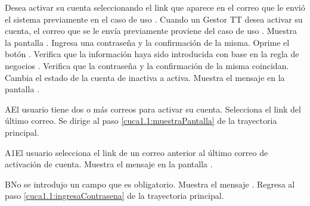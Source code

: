 \begin{UCtrayectoria}
	\UCpaso[\UCactor] Desea activar su cuenta seleccionando el link que aparece en el correo que le envió el sistema previamente en el caso de uso . Cuando un Gestor TT desea activar su cuenta, el correo que se le envía previamente proviene del caso de uso . 
	\UCpaso[\UCsist]  Muestra la pantalla . \label{cuca1.1:muestraPantalla}
	\UCpaso[\UCactor] Ingresa una contraseña y la confirmación de la misma.
	\UCpaso[\UCactor] Oprime el botón . 
	\UCpaso[\UCsist] Verifica que la información haya sido introducida con base en la regla de negocios .   \label{cuca1.1:ingresaContrasena}
	\UCpaso[\UCsist] Verifica que la contraseña y la confirmación de la misma coincidan. 
	\UCpaso[\UCsist] Cambia el estado de la cuenta de inactiva a activa. 
	\UCpaso[\UCsist] Muestra el mensaje  en la pantalla .
\end{UCtrayectoria}

\begin{UCtrayectoriaA}{A}{El usuario tiene dos o más correos para activar su cuenta.}
	\UCpaso[\UCactor] Selecciona el link del último correo. 
	\UCpaso[\UCsist] Se dirige al paso \ref{cuca1.1:muestraPantalla} de la trayectoria principal.
\end{UCtrayectoriaA}

\begin{UCtrayectoriaA}{A1}{El usuario selecciona el link de un correo anterior al último correo de activación de cuenta.}
	\UCpaso[\UCsist] Muestra el mensaje  en la pantalla . 
\end{UCtrayectoriaA}

\begin{UCtrayectoriaA}{B}{No se introdujo un campo que es obligatorio.}
	\UCpaso[\UCsist] Muestra el mensaje .
	\UCpaso[] Regresa al paso \ref{cuca1.1:ingresaContrasena} de la trayectoria principal.
\end{UCtrayectoriaA}

